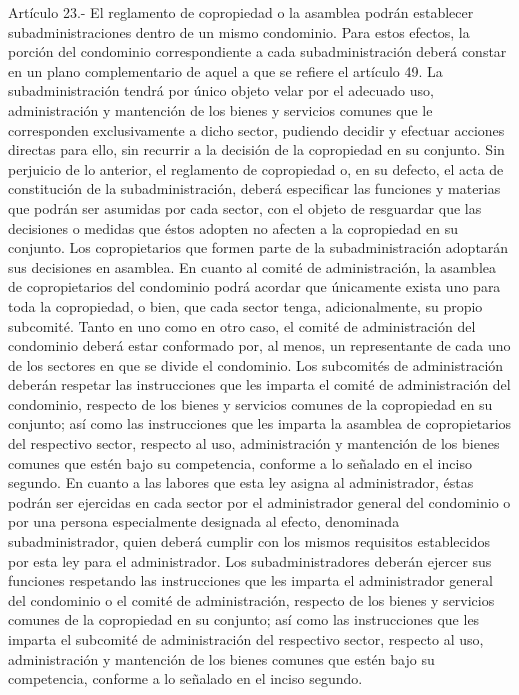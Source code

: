      
    Artículo 23.- El reglamento de copropiedad o la asamblea podrán establecer subadministraciones dentro de un mismo condominio. Para estos efectos, la porción del condominio correspondiente a cada subadministración deberá constar en un plano complementario de aquel a que se refiere el artículo 49.
    La subadministración tendrá por único objeto velar por el adecuado uso, administración y mantención de los bienes y servicios comunes que le corresponden exclusivamente a dicho sector, pudiendo decidir y efectuar acciones directas para ello, sin recurrir a la decisión de la copropiedad en su conjunto. Sin perjuicio de lo anterior, el reglamento de copropiedad o, en su defecto, el acta de constitución de la subadministración, deberá especificar las funciones y materias que podrán ser asumidas por cada sector, con el objeto de resguardar que las decisiones o medidas que éstos adopten no afecten a la copropiedad en su conjunto.
    Los copropietarios que formen parte de la subadministración adoptarán sus decisiones en asamblea.
    En cuanto al comité de administración, la asamblea de copropietarios del condominio podrá acordar que únicamente exista uno para toda la copropiedad, o bien, que cada sector tenga, adicionalmente, su propio subcomité. Tanto en uno como en otro caso, el comité de administración del condominio deberá estar conformado por, al menos, un representante de cada uno de los sectores en que se divide el condominio. Los subcomités de administración deberán respetar las instrucciones que les imparta el comité de administración del condominio, respecto de los bienes y servicios comunes de la copropiedad en su conjunto; así como las instrucciones que les imparta la asamblea de copropietarios del respectivo sector, respecto al uso, administración y mantención de los bienes comunes que estén bajo su competencia, conforme a lo señalado en el inciso segundo.
    En cuanto a las labores que esta ley asigna al administrador, éstas podrán ser ejercidas en cada sector por el administrador general del condominio o por una persona especialmente designada al efecto, denominada subadministrador, quien deberá cumplir con los mismos requisitos establecidos por esta ley para el administrador. Los subadministradores deberán ejercer sus funciones respetando las instrucciones que les imparta el administrador general del condominio o el comité de administración, respecto de los bienes y servicios comunes de la copropiedad en su conjunto; así como las instrucciones que les imparta el subcomité de administración del respectivo sector, respecto al uso, administración y mantención de los bienes comunes que estén bajo su competencia, conforme a lo señalado en el inciso segundo.
     
